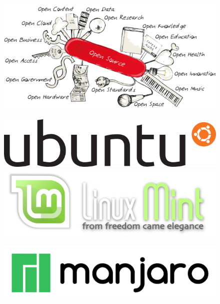 \begin{frame}
	\begin{figure}
		\includegraphics[scale=1]{resources/open_swiss_knife.png}
	\end{figure}
\end{frame}

\begin{frame}
	\begin{figure}
		\includegraphics[scale=0.3]{resources/640px-Ubuntu_logo.png}
		\includegraphics[scale=0.3]{resources/640px-Linux_Mint_logo_and_wordmark.png}
	\end{figure}
	\begin{figure}
		\includegraphics[scale=0.2]{resources/1200px-Manjaro.png}
	\end{figure}
\end{frame}

